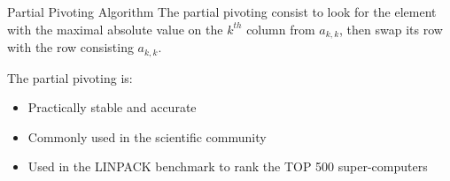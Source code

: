 \begin{frame}{Partial Pivoting Algorithm}
The partial pivoting consist to look for the element with the maximal absolute value on the $k^{th}$ column from $a_{k,k}$, then swap its row with the row consisting $a_{k,k}$.
\begin{flushleft}
The partial pivoting is:
\begin{itemize}
\item Practically stable and accurate
\item Commonly used in the scientific community
\item Used in the LINPACK benchmark to rank the TOP 500 super-computers
\end{itemize}
\end{flushleft}
\end{frame}
%
%

